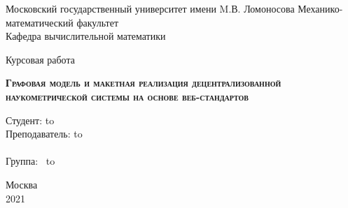 \begin{titlepage}
\newpage
\begin{center}
Московский государственный университет имени M.В. Ломоносова
Механико-математический факультет \\
Кафедра вычислительной математики \\
\end{center}

\vspace{8em}

\begin{center}
\Large Курсовая работа \\ 
\end{center}

\vspace{2em}

\begin{center}
\textsc{\textbf{Графовая модель и макетная реализация децентрализованной наукометрической системы на основе веб-стандартов}}
\end{center}

\vspace{24em}



\newbox{\lbox}
\newlength{\maxl}
\setlength{\maxl}{\wd\lbox}
\hfill\parbox{13cm}{
\hspace*{5cm}\hspace*{-5cm}Студент: \qquad\qquad\hbox to\\
\hspace*{5cm}\hspace*{-5cm}Преподаватель: \hbox to\\
\\
\hspace*{5cm}\hspace*{-5cm}Группа:\qquad\qquad $\;\:$ \hbox to\\
}


\vspace{\fill}

\begin{center}
Москва \\2021
\end{center}

\end{titlepage}
\newpage
